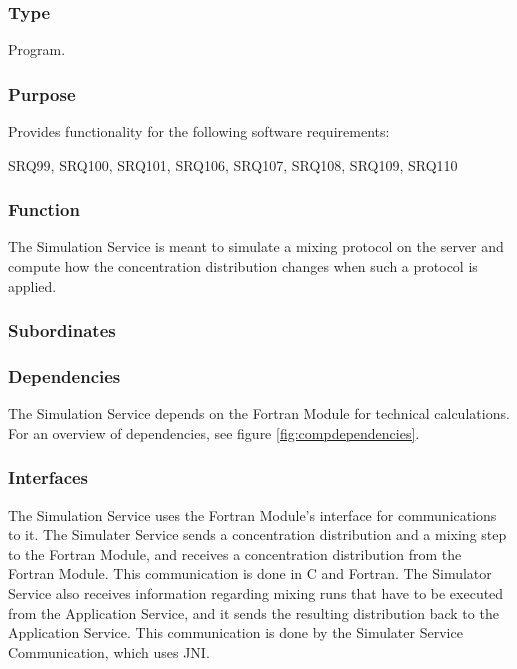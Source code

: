 \subsubsection*{Type}
Program.

\subsubsection*{Purpose}
Provides functionality for the following software requirements:

\noindent SRQ99, SRQ100, SRQ101, SRQ106, SRQ107, SRQ108, SRQ109, SRQ110

\subsubsection*{Function}
The Simulation Service is meant to simulate a mixing protocol on the server and compute how the concentration distribution changes when such a protocol is applied.

\subsubsection*{Subordinates}

\subsubsection*{Dependencies}
The Simulation Service depends on the Fortran Module for technical calculations. For an overview of dependencies, see figure \ref{fig:compdependencies}.

\subsubsection*{Interfaces}
The Simulation Service uses the Fortran Module's interface for communications to it. The Simulater Service sends a concentration distribution and a mixing step to the Fortran Module, and receives a concentration distribution from the Fortran Module. This communication is done in C and Fortran.
The Simulator Service also receives information regarding mixing runs that have to be executed from the Application Service, and it sends the resulting distribution back to the Application Service. This communication is done by the Simulater Service Communication, which uses JNI.

